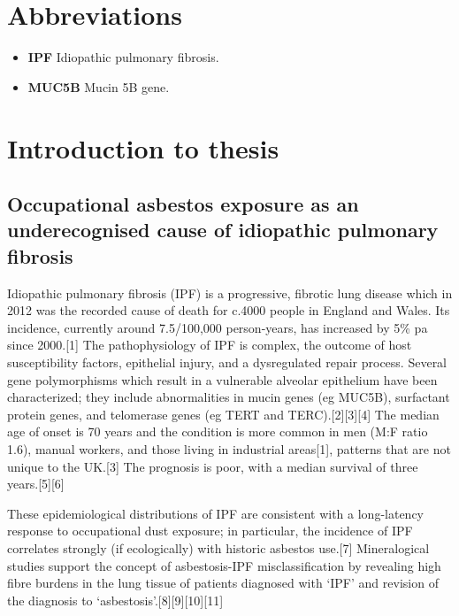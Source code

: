 \documentclass[12pt,a4paper,]{report}
\providecommand{\tightlist}{%
  \setlength{\itemsep}{0pt}\setlength{\parskip}{0pt}}
\begin{document}
\hypertarget{abbreviations}{%
\chapter*{Abbreviations}\label{abbreviations}}

\begin{itemize}
\tightlist
\item
  \textbf{IPF} Idiopathic pulmonary fibrosis.
\item
  \textbf{MUC5B} Mucin 5B gene.
\end{itemize}

\newpage
\setcounter{page}{1}
\renewcommand{\thepage}{\arabic{page}}

\hypertarget{introduction-to-thesis}{%
\chapter{Introduction to thesis}\label{introduction-to-thesis}}

\hypertarget{occupational-asbestos-exposure-as-an-underecognised-cause-of-idiopathic-pulmonary-fibrosis}{%
\section{Occupational asbestos exposure as an underecognised cause of
idiopathic pulmonary
fibrosis}\label{occupational-asbestos-exposure-as-an-underecognised-cause-of-idiopathic-pulmonary-fibrosis}}

Idiopathic pulmonary fibrosis (IPF) is a progressive, fibrotic lung
disease which in 2012 was the recorded cause of death for c.4000 people
in England and Wales. Its incidence, currently around 7.5/100,000
person-years, has increased by 5\% pa since 2000.{[}1{]} The
pathophysiology of IPF is complex, the outcome of host susceptibility
factors, epithelial injury, and a dysregulated repair process. Several
gene polymorphisms which result in a vulnerable alveolar epithelium have
been characterized; they include abnormalities in mucin genes (eg
MUC5B), surfactant protein genes, and telomerase genes (eg TERT and
TERC).{[}2{]}{[}3{]}{[}4{]} The median age of onset is 70 years and the
condition is more common in men (M:F ratio 1.6), manual workers, and
those living in industrial areas{[}1{]}, patterns that are not unique to
the UK.{[}3{]} The prognosis is poor, with a median survival of three
years.{[}5{]}{[}6{]}

These epidemiological distributions of IPF are consistent with a
long-latency response to occupational dust exposure; in particular, the
incidence of IPF correlates strongly (if ecologically) with historic
asbestos use.{[}7{]} Mineralogical studies support the concept of
asbestosis-IPF misclassification by revealing high fibre burdens in the
lung tissue of patients diagnosed with `IPF' and revision of the
diagnosis to `asbestosis'.{[}8{]}{[}9{]}{[}10{]}{[}11{]}
\end{document}
